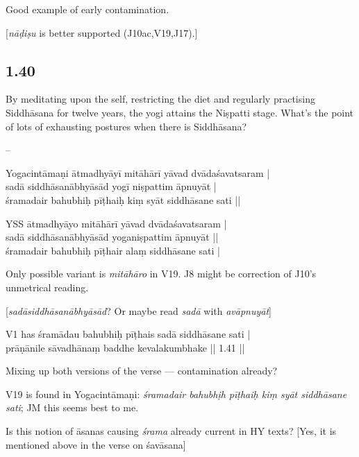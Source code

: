 \begin{ekdosis}
\begin{philcomm}[hp01_039]
Good example of early contamination.

[\emph{nāḍiṣu} is better supported (J10ac,V19,J17).]
\end{philcomm}

\subsection*{1.40}
\begin{translation}[hp01_040]
By meditating upon the self, restricting the diet and regularly practising Siddhāsana for twelve years, the yogi attains the Niṣpatti stage.
What’s the point of lots of exhausting postures when there is Siddhāsana?
\end{translation}

\begin{sources}[hp01_040]
--
\end{sources}

\begin{testimonia}[hp01_040]
Yogacintāmaṇi
\startverse
ātmadhyāyī mitāhārī yāvad dvādaśavatsaram |\\
sadā siddhāsanābhyāsād yogī niṣpattim āpnuyāt |\\
śramadair bahubhiḥ pīṭhaiḥ kiṃ syāt siddhāsane sati ||
\endverse

YSS
\startverse
ātmadhyāyo mitāhārī yāvad dvādaśavatsaram |\\
sadā siddhāsanābhyāsād yoganiṣpattim āpnuyāt ||\\
śramadair bahubhiḥ pīṭhair alaṃ siddhāsane sati |
\endverse
\end{testimonia}

\begin{philcomm}[hp01_040]
Only possible variant is \emph{mitāhāro} in V19.
J8 might be correction of J10’s unmetrical reading.

[\emph{sadāsiddhāsanābhyāsād}? Or maybe read \emph{sadā} with \emph{avāpnuyāt}]

V1 has
\startverse
śramādau bahubhiḥ pīṭhais sadā siddhāsane sati |\\
prāṇānile sāvadhānaṃ baddhe kevalakumbhake || 1.41 ||
\endverse

Mixing up both versions of the verse — contamination already?

V19 is found in Yogacintāmaṇi: \emph{śramadair bahubhịh pīṭhaiḥ kiṃ syāt siddhāsane sati}; JM this seems best to me.

Is this notion of āsanas causing \emph{śrama} already current in HY texts?
[Yes, it is mentioned above in the verse on śavāsana]
\end{philcomm}



\end{ekdosis}
